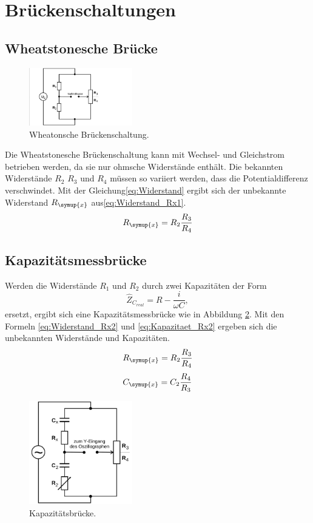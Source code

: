 \section{Brückenschaltungen}
\subsection{Wheatstonesche Brücke}
\begin{figure}
  \centering
  \includegraphics[width=0.4\textwidth]{Bilder/Wheatonsche.png}
  \caption{Wheatonsche Brückenschaltung\cite{sample}.}
  \label{fig:wheatonsche}
\end{figure}
Die Wheatstonesche Brückenschaltung kann mit Wechsel- und Gleichstrom betrieben werden,
da sie nur ohmsche Widerstände enthält. Die bekannten Widerstände $R_2$ $R_3$ und $R_4$
 müssen so variiert werden, dass die Potentialdifferenz verschwindet. Mit der
Gleichung\eqref{eq:Widerstand} ergibt sich der unbekannte Widerstand $R_\symup{x}$
aus\eqref{eq:Widerstand_Rx1}.
\begin{equation}
R_\symup{x}=R_2 \frac{R_3}{R_4}
\label{eq:Widerstand_Rx1}
\end{equation}
\subsection{Kapazitätsmessbrücke}
Werden die Widerstände $R_1$ und $R_2$ durch zwei Kapazitäten der Form
\begin{equation}
\hat{Z}_{C_{real}}=R-\frac{i}{\omega C}  ,
\end{equation}
ersetzt, ergibt sich eine Kapazitätsmessbrücke wie in Abbildung \ref{fig:capbruecke}.
Mit den Formeln \eqref{eq:Widerstand_Rx2} und \eqref{eq:Kapazitaet_Rx2} ergeben
sich die unbekannten Widerstände und Kapazitäten.
\begin{equation}
R_\symup{x}=R_2\frac{R_3}{R_4}
\label{eq:Widerstand_Rx2}
\end{equation}
\begin{equation}
C_\symup{x}=C_2\frac{R_4}{R_3}
\label{eq:Kapazitaet_Rx2}
\end{equation}
\begin{figure}
  \centering
  \includegraphics[width=0.4\textwidth]{Bilder/Capazitaetsbruecke.png}
  \caption{Kapazitätsbrücke\cite{sample}.}
  \label{fig:capbruecke}
\end{figure}
